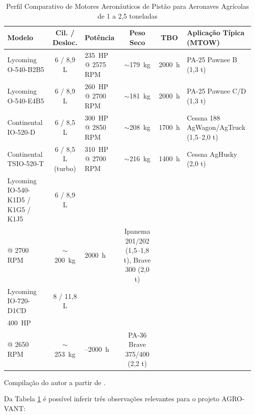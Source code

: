 \documentclass[a4paper,12pt]{article}
\begin{document}
\begin{table}[H]
\centering
\caption{Perfil Comparativo de Motores Aeronáuticos de Pistão para Aeronaves Agrícolas de 1 a 2{,}5 toneladas}
\label{tab:motores_faixa}
\scriptsize
\renewcommand{\arraystretch}{1.3}
\begin{tabularx}{\textwidth}{@{} 
    >{\hsize=1.0\hsize\raggedright\arraybackslash}X
    c 
    >{\hsize=0.8\hsize\raggedright\arraybackslash}X
    c 
    c 
    >{\hsize=1.2\hsize\raggedright\arraybackslash}X
    @{}}
\toprule
\textbf{Modelo} & \textbf{Cil. / Desloc.} & \textbf{Potência} & \textbf{Peso Seco} & \textbf{TBO} & \textbf{Aplicação Típica (MTOW)} \\ \midrule
Lycoming O-540-B2B5 & 6 / 8{,}9 L & \SI{235}{HP} @ 2575 RPM & $\sim$\SI{179}{kg} & \SI{2000}{h} & PA-25 Pawnee B (1{,}3 t) \\
\addlinespace
Lycoming O-540-E4B5 & 6 / 8{,}9 L & \SI{260}{HP} @ 2700 RPM & $\sim$\SI{181}{kg} & \SI{2000}{h} & PA-25 Pawnee C/D (1{,}3 t) \\
\addlinespace
Continental IO-520-D & 6 / 8{,}5 L & \SI{300}{HP} @ 2850 RPM & $\sim$\SI{208}{kg} & \SI{1700}{h} & Cessna 188 AgWagon/AgTruck (1{,}5--2{,}0 t) \\
\addlinespace
Continental TSIO-520-T & 6 / 8{,}5 L (turbo) & \SI{310}{HP} @ 2700 RPM & $\sim$\SI{216}{kg} & \SI{1400}{h} & Cessna AgHusky (2{,}0 t) \\
\addlinespace
Lycoming IO-540-K1D5 / K1G5 / K1J5 & 6 / 8{,}9 L & \shortstack{\SI{300}{HP}/\SI{320}{HP}\\@ 2700 RPM} & $\sim$\SI{200}{kg} & \SI{2000}{h} & Ipanema 201/202 (1{,}5--1{,}8 t), Brave 300 (2{,}0 t) \\
\addlinespace
Lycoming IO-720-D1CD & 8 / 11{,}8 L & \shortstack{\SI{375}{HP}--\\\SI{400}{HP}\\@ 2650 RPM} & $\sim$\SI{253}{kg} & 1.800--\SI{2000}{h} & PA-36 Brave 375/400 (2{,}2 t) \\ \bottomrule
\end{tabularx}
\par\footnotesize Compilação do autor a partir de \cite{lycomingmanual, io360manual, lycoming_io720, continental_io520, embraer202, piper_pa25, cessna_188, piper_pa36}.
\end{table}

Da Tabela \ref{tab:motores_faixa} é possível inferir três observações relevantes para o projeto AGRO-VANT:
\end{document}
